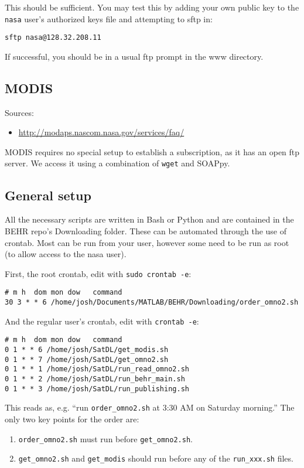\documentclass[12pt]{article}
\begin{document}
	This should be sufficient. You may test this by adding your own public key to the \lstinline$nasa$ user's authorized keys file and attempting to sftp in:
\begin{lstlisting}
sftp nasa@128.32.208.11
\end{lstlisting}
If successful, you should be in a usual ftp prompt in the www directory.

\subsection{MODIS}
	Sources:
	\begin{itemize}
	\item \url{http://modaps.nascom.nasa.gov/services/faq/}
	\end{itemize}
	MODIS requires no special setup to establish a subscription, as it has an open ftp server. We access it using a combination of \lstinline$wget$ and SOAPpy.
	
\subsection{General setup}
	All the necessary scripts are written in Bash or Python and are contained in the BEHR repo's Downloading folder. These can be automated through the use of crontab. Most can be run from your user, however some need to be run as root (to allow access to the nasa user).
	
	First, the root crontab, edit with \lstinline$sudo crontab -e$:
	\begin{lstlisting}
# m h  dom mon dow   command
30 3 * * 6 /home/josh/Documents/MATLAB/BEHR/Downloading/order_omno2.sh
	\end{lstlisting}
	
	And the regular user's crontab, edit with \lstinline$crontab -e$:
	\begin{lstlisting}
# m h  dom mon dow   command
0 1 * * 6 /home/josh/SatDL/get_modis.sh
0 1 * * 7 /home/josh/SatDL/get_omno2.sh
0 1 * * 1 /home/josh/SatDL/run_read_omno2.sh
0 1 * * 2 /home/josh/SatDL/run_behr_main.sh
0 1 * * 3 /home/josh/SatDL/run_publishing.sh
	\end{lstlisting}
	
	This reads as, e.g. ``run \lstinline$order_omno2.sh$ at 3:30 AM on Saturday morning.''  The only two key points for the order are:
	\begin{enumerate}
	\item \lstinline$order_omno2.sh$ must run before \lstinline$get_omno2.sh$.
	\item \lstinline$get_omno2.sh$ and \lstinline$get_modis$ should run before any of the \lstinline$run_xxx.sh$ files.
	\end{enumerate}
	
\end{document}
